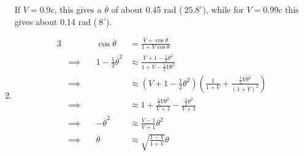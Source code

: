 \documentclass[12pt]{article}
\begin{document}
\begin{enumerate}[label=(\alph*)]
        If $V = 0.9c$, this gives a $\overline{\theta}$ of about 0.45 rad ($~25.8^\circ$), while for $V = 0.99c$ this gives about 0.14 rad ($~8^\circ$).
    \item 
        \begin{alignat*}{3}
            &         \quad &\cos\overline{\theta} &= \frac{V + \cos\theta}{1 + V\cos\theta} \\
            &\implies \quad &  1 - \frac{1}{2}\overline{\theta}^2  &\approx \frac{V + 1 - \frac{1}{2}\theta^2}{1 + V - \frac{1}{2}V\theta^2}  \\
            &\implies \quad & \quad &\approx (V + 1 - \frac{1}{2}\theta^2)\left(\frac{1}{1 + V} + \frac{\frac{1}{2}V\theta^2}{(1 + V)^2}\right) \\
            &\implies \quad & \quad &\approx 1 + \frac{\frac{1}{2}V\theta^2}{V + 1} - \frac{\frac{1}{2}\theta^2}{V + 1} \\
            &\implies \quad & -\overline{\theta}^2 &\approx \frac{V - 1}{V + 1}\theta^2 \\
            &\implies \quad & \overline{\theta} &\approx \sqrt{\frac{1 - V}{1 + V}}\theta \\
        \end{alignat*}
\end{enumerate}
\end{document}
